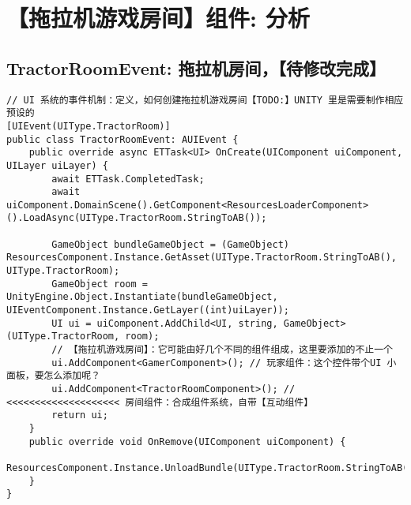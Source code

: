 \documentclass[9pt, b5paper]{article}
\begin{document}
\section{【拖拉机游戏房间】组件: 分析}
\label{sec-3}
\subsection{TractorRoomEvent: 拖拉机房间，【待修改完成】}
\label{sec-3-1}
\begin{verbatim}
// UI 系统的事件机制：定义，如何创建拖拉机游戏房间【TODO:】UNITY 里是需要制作相应预设的
[UIEvent(UIType.TractorRoom)]
public class TractorRoomEvent: AUIEvent {
    public override async ETTask<UI> OnCreate(UIComponent uiComponent, UILayer uiLayer) {
        await ETTask.CompletedTask;
        await uiComponent.DomainScene().GetComponent<ResourcesLoaderComponent>().LoadAsync(UIType.TractorRoom.StringToAB());

        GameObject bundleGameObject = (GameObject) ResourcesComponent.Instance.GetAsset(UIType.TractorRoom.StringToAB(), UIType.TractorRoom);
        GameObject room = UnityEngine.Object.Instantiate(bundleGameObject, UIEventComponent.Instance.GetLayer((int)uiLayer));
        UI ui = uiComponent.AddChild<UI, string, GameObject>(UIType.TractorRoom, room);
        // 【拖拉机游戏房间】：它可能由好几个不同的组件组成，这里要添加的不止一个
        ui.AddComponent<GamerComponent>(); // 玩家组件：这个控件带个UI 小面板，要怎么添加呢？
        ui.AddComponent<TractorRoomComponent>(); // <<<<<<<<<<<<<<<<<<<< 房间组件：合成组件系统，自带【互动组件】
        return ui;
    }
    public override void OnRemove(UIComponent uiComponent) {
        ResourcesComponent.Instance.UnloadBundle(UIType.TractorRoom.StringToAB());
    }
}
\end{verbatim}
\end{document}
